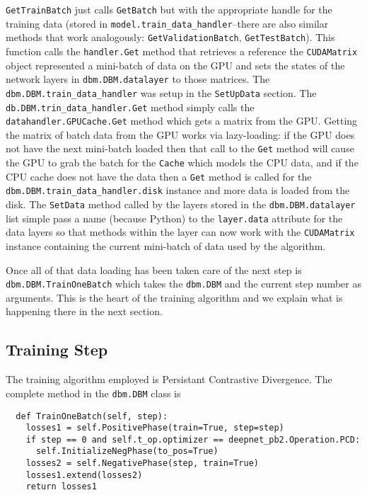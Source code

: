 \documentclass{article} %
\begin{document}
\texttt{GetTrainBatch} just calls \texttt{GetBatch} but with the appropriate handle for the training data (stored in \texttt{model.train\_data\_handler}--there are also similar methods that work analogously: \texttt{GetValidationBatch}, \texttt{GetTestBatch}).  This function
calls the \texttt{handler.Get} method that retrieves a reference the \texttt{CUDAMatrix} object represented a mini-batch of data
on the GPU and sets the states of the network layers in \texttt{dbm.DBM.datalayer} to those matrices.  The \texttt{dbm.DBM.train\_data\_handler}
was setup in the \texttt{SetUpData} section.  The \texttt{db.DBM.trin\_data\_handler.Get} method simply calls the \texttt{datahandler.GPUCache.Get} method which gets a matrix from the GPU.  Getting the matrix of batch data from the GPU works via lazy-loading: if the GPU does not
have the next mini-batch loaded then that call to the \texttt{Get} method will cause the GPU to grab the batch for the \texttt{Cache} which
models the CPU data, and if the CPU cache does not have the data then a \texttt{Get} method is called for the \texttt{dbm.DBM.train\_data\_handler.disk} instance and more data is loaded from the disk.  The \texttt{SetData} method called by the layers stored in the 
\texttt{dbm.DBM.datalayer} list simple pass a name (because Python) to the \texttt{layer.data} attribute for the data layers so that
methods within the layer can now work with the \texttt{CUDAMatrix} instance containing the current mini-batch of data used by the algorithm.

Once all of that data loading has been taken care of the next step is \texttt{dbm.DBM.TrainOneBatch} which takes the \texttt{dbm.DBM}
and the current step number as arguments.  This is the heart of the training algorithm and we explain what is happening there
in the next section.

\subsection{Training Step}

The training algorithm employed is Persistant Contrastive Divergence.  The complete method in the \texttt{dbm.DBM} class is
\begin{verbatim}
  def TrainOneBatch(self, step):
    losses1 = self.PositivePhase(train=True, step=step)
    if step == 0 and self.t_op.optimizer == deepnet_pb2.Operation.PCD:
      self.InitializeNegPhase(to_pos=True)
    losses2 = self.NegativePhase(step, train=True)
    losses1.extend(losses2)
    return losses1
\end{verbatim}
\end{document}
